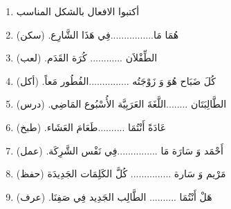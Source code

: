 \documentclass[a4paper]{article}
\begin{document}
\begin{enumerate}
\item أكتبوا الافعال بالشكل المناسب
\item هُمَا مَا................فِي هَذَا الشَّارِع. (سكن)
\item الطِّفْلاَن ............ كُرَة القَدَم. (لعب)
\item كُلَ ضَبَاح هُوَ وَ زَوْجَتُه ...............الفُطُور مَعاً. (أكل)
\item الطَّالِبَتَان ........اللَّغَةَ العَرَبِيَّة الأُسْبُوع المَاضِي. (درس)
\item عَادَةً أَنْتُمَا ..........طَعَامَ العَشَاء. (طبخ)
\item أَحْمَد وَ سَارَة مَا ...............فِي نَفْس الشَّرِكَة. (عمل)
\item مَرْيم وَ سَارة ............... كُلَّ الكَلِمَات الجَدِيدَة (حفظ)
\item هَلْ أَنْتُمَا .......... الطَّالِب الجَدِيد فِي صَفِنَا. (عرف)

\end{enumerate}



\end{document}

